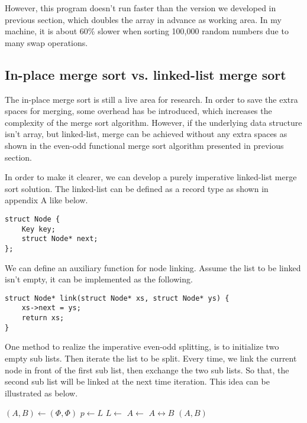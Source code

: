 \documentclass[UTF8]{article}
\begin{document}
However, this program doesn't run faster than the version we developed in previous section, which doubles
the array in advance as working area. In my machine, it is about 60\% slower when sorting 100,000 random
numbers due to many swap operations.

\subsection{In-place merge sort vs. linked-list merge sort}
The in-place merge sort is still a live area for research. In order to save the extra spaces for merging,
some overhead has be introduced, which increases the complexity of the merge sort algorithm. However, if
the underlying data structure isn't array, but linked-list, merge can be achieved without any extra spaces
as shown in the even-odd functional merge sort algorithm presented in previous section.

In order to make it clearer, we can develop a purely imperative linked-list merge sort solution.
The linked-list can be defined as a record type as shown in appendix A like below.

\lstset{language=C}
\begin{lstlisting}
struct Node {
    Key key;
    struct Node* next;
};
\end{lstlisting}

We can define an auxiliary function for node linking. Assume the list to be linked isn't empty, it
can be implemented as the following.

\lstset{language=C}
\begin{lstlisting}
struct Node* link(struct Node* xs, struct Node* ys) {
    xs->next = ys;
    return xs;
}
\end{lstlisting}

One method to realize the imperative even-odd splitting, is to initialize two empty sub lists.
Then iterate the list to be split. Every time, we link the current node in front of the
first sub list, then exchange the two sub lists. So that, the second sub list will be linked
at the next time iteration. This idea can be illustrated as below.

\begin{algorithmic}[1]
  \State $(A, B) \gets (\Phi, \Phi)$
    \State $p \gets L$
    \State $L \gets $ 
    \State $A \gets $ 
    \State {} $A \leftrightarrow B$
  \EndWhile
  \State \Return $(A, B)$
\EndFunction
\end{algorithmic}
\end{document}
